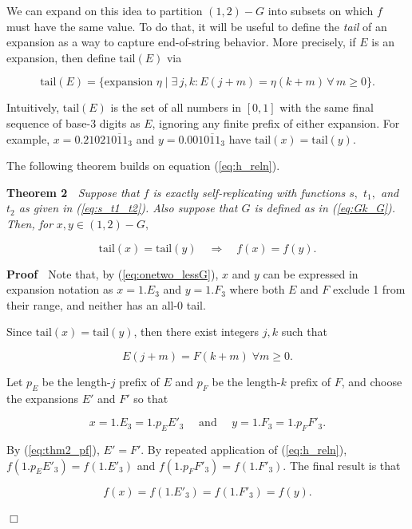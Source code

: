\documentclass[20pt,]{extarticle}
\begin{document}
\newcommand{\tail}{\text{tail}}

We can expand on this idea to partition \((1,2) - G\) into subsets on
which \(f\) must have the same value. To do that, it will be useful to
define the \emph{tail} of an expansion as a way to capture end-of-string
behavior. More precisely, if \(E\) is an expansion, then define
\(\tail(E)\) via

\[\tail(E) = \big\{\text{expansion }\eta \;\big|\;
\exists\, j, k: E(j + m) = \eta(k + m) \,\forall\, m \ge 0\big\}.\]

Intuitively, \(\tail(E)\) is the set of all numbers in \([0, 1]\) with
the same final sequence of base-3 digits as \(E\), ignoring any finite
prefix of either expansion. For example, \(x=0.21021\overline{011}_3\)
and \(y=0.001\overline{011}_3\) have
\(\text{tail}(x) = \text{tail}(y)\).

The following theorem builds on equation (\ref{eq:h_reln}).

\textbf{Theorem 2} \(\;\) \emph{Suppose that \(f\) is exactly
self-replicating with functions \(s,\) \(t_1,\) and \(t_2\) as given in
(\ref{eq:s_t1_t2}). Also suppose that \(G\) is defined as in
(\ref{eq:Gk_G}). Then, for} \(x,y\in (1,2)-G,\)

\[\tail(x) = \tail(y) \quad\Rightarrow\quad f(x) = f(y).\]

\textbf{Proof} \(\;\) Note that, by (\ref{eq:onetwo_lessG}), \(x\) and
\(y\) can be expressed in expansion notation as \(x=1.E_3\) and
\(y=1.F_3\) where both \(E\) and \(F\) exclude 1 from their range, and
neither has an all-0 tail.

Since \(\tail(x) = \tail(y)\), then there exist integers \(j, k\) such
that

\begin{equation}E(j+m)=F(k+m)\; \forall m\ge 0.\label{eq:thm2_pf}\end{equation}

Let \(p_E\) be the length-\(j\) prefix of \(E\) and \(p_F\) be the
length-\(k\) prefix of \(F\), and choose the expansions \(E'\) and
\(F'\) so that

\[x = 1.E_3 = 1.p_EE'_3 \quad\text{ and }\quad y = 1.F_3 = 1.p_FF'_3.\]

By (\ref{eq:thm2_pf}), \(E'=F'\). By repeated application of
(\ref{eq:h_reln}), \(f(1.p_EE'_3) = f(1.E'_3)\) and
\(f(1.p_FF'_3) = f(1.F'_3)\). The final result is that

\[f(x) = f(1.E'_3) = f(1.F'_3) = f(y).\]

\hfill\(\Box\)
\end{document}
